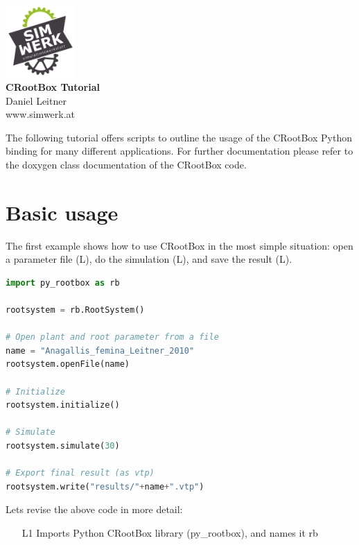\documentclass[a4paper]{article}
\begin{document}
\begin{center}
\includegraphics[width=0.2\textwidth]{sw_logo} \\
\vspace{0.5 cm}
\huge{\textbf{CRootBox Tutorial}} \\
\vspace{0.5 cm}
\normalsize
Daniel Leitner \\
www.simwerk.at \\
\end{center}
\vspace{0.5 cm}

\noindent 
The following tutorial offers scripts to outline the usage of the CRootBox Python binding for many different applications. 
For further documentation please refer to the doxygen class documentation of the CRootBox code.

\section*{Basic usage}
 
The first example shows how to use CRootBox in the most simple situation: open a parameter file (L), do the simulation (L), and save the result (L). 

\begin{lstlisting}[language=Python, caption=Example 1a]
import py_rootbox as rb

rootsystem = rb.RootSystem()

# Open plant and root parameter from a file
name = "Anagallis_femina_Leitner_2010" 
rootsystem.openFile(name) 

# Initialize
rootsystem.initialize() 

# Simulate
rootsystem.simulate(30) 

# Export final result (as vtp)
rootsystem.write("results/"+name+".vtp") 
\end{lstlisting}

\noindent 
Lets revise the above code in more detail: 
\begin{itemize}
 \item[L1] Imports Python CRootBox library (py\_rootbox), and names it rb
\end{itemize}
\end{document}

